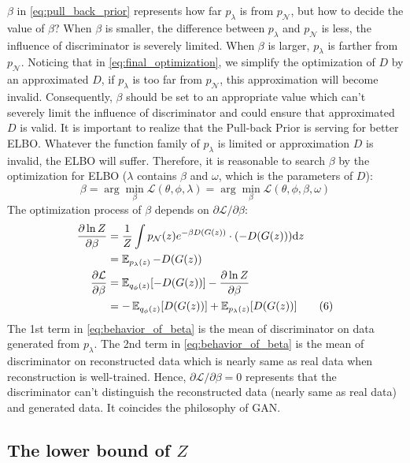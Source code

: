 $\beta$ in \cref{eq:pull_back_prior} represents how far $p_\lambda$ is from $p_\mathcal{N}$, but how to decide the value of $\beta$? When $\beta$ is smaller, the difference between $p_\lambda$ and $p_\mathcal{N}$ is less, \IE the influence of discriminator is severely limited. When $\beta$ is larger, $p_\lambda$ is farther from $p_\mathcal{N}$. Noticing that in \cref{eq:final_optimization}, we simplify the optimization of $D$ by an approximated $D$, if $p_\lambda$ is too far from $p_\mathcal{N}$, this approximation will become invalid. Consequently, $\beta$ should be set to an appropriate value which can't severely limit the influence of discriminator and could ensure that approximated $D$ is valid. It is important to realize that the Pull-back Prior is serving for better ELBO. Whatever the function family of $p_\lambda$ is limited or approximation $D$ is invalid, the ELBO will suffer. Therefore, it is reasonable to search $\beta$ by the optimization for ELBO ($\lambda$ contains $\beta$ and $\omega$, which is the parameters of $D$):
\begin{equation}
	\beta = \arg \min_{\beta} \mathcal{L}(\theta, \phi, \lambda) = \arg \min_{\beta} \mathcal{L}(\theta, \phi, \beta, \omega) \tag{5}
\end{equation}
The optimization process of $\beta$ depends on $\partial \mathcal{L}/\partial \beta$:
\begin{align*}\label{eq:behavior_of_beta}
\frac{\partial \ln Z}{\partial \beta} &= \frac{1}{Z} \int p_\mathcal{N}(z) e^{-\beta D(G(z))} \cdot (-D(G(z))) \mathrm{d} z \\
&=  \operatorname{\mathbb{E}}_{p_\lambda(z)} - D(G(z))  \\
\frac{\partial \mathcal{L}}{\partial \beta} &= \operatorname{\mathbb{E}}_{q_\phi(z)}[ -D(G(z))] - \frac{\partial \ln Z}{\partial \beta} \\
&= - \operatorname{\mathbb{E}}_{q_\phi(z)}[ D(G(z))] + \operatorname{\mathbb{E}}_{p_\lambda(z)}[ D(G(z))]   \tag{6}
\end{align*}
The 1st term in \cref{eq:behavior_of_beta} is the mean of discriminator on data generated from $p_\lambda$. The 2nd term in \cref{eq:behavior_of_beta} is the mean of discriminator on reconstructed data which is nearly same as real data when reconstruction is well-trained. Hence, $\partial \mathcal{L}/\partial \beta = 0$ represents that the discriminator can't distinguish the reconstructed data (nearly same as real data) and generated data. It coincides the philosophy of GAN.

\subsection{The lower bound of $Z$}\label{subsec:determine_z}

